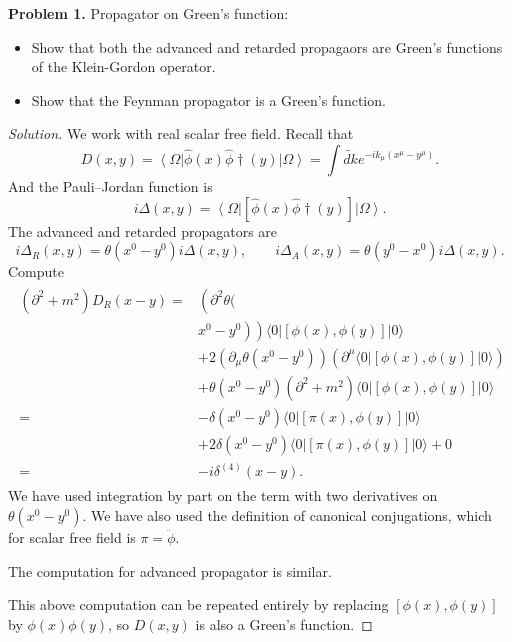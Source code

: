 
\textbf{Problem 1.} Propagator on Green's function:
\begin{itemize}
	\item Show that both the advanced and retarded propagaors are Green's functions of the Klein-Gordon operator.
	\item Show that the Feynman propagator is a Green's function.
\end{itemize}
	\begin{proof}[Solution]
		We work with real scalar free field. Recall that
		\[
			D(x,y) = \left\langle \Omega \right| \hat{\phi} \left( x \right) \hat{\phi} \dag (y) \left| \Omega \right\rangle = \int \tilde{dk} e^{- i k_ \mu (x^\mu - y^\mu)}
		.\] 
		And the Pauli–Jordan function is
		\[
			i \Delta(x,y) = \left\langle \Omega \right| \left[ \hat{\phi} (x) \hat{\phi} \dag(y) \right] \left| \Omega \right\rangle 
		.\] 
		The advanced and retarded propagators are
		\[
			i \Delta_R(x, y) = \theta(x^0 - y^0) i \Delta(x, y), \qquad 
			i \Delta_A(x,y) = \theta(y^0 - x^0) i \Delta(x,y)
		.\]
		Compute
		\begin{align*}
\begin{aligned}
\left(\partial^2+m^2\right) D_R(x-y)= & \left(\partial^2 \theta( \right. \\
& \left.\left.x^0-y^0\right)\right)\langle 0|[\phi(x), \phi(y)]|0\rangle \\
& +2\left(\partial_\mu \theta\left(x^0-y^0\right)\right)\left(\partial^\mu\langle 0|[\phi(x), \phi(y)]|0\rangle\right) \\
& +\theta\left(x^0-y^0\right)\left(\partial^2+m^2\right)\langle 0|[\phi(x), \phi(y)]|0\rangle \\
= & -\delta\left(x^0-y^0\right)\langle 0|[\pi(x), \phi(y)]|0\rangle \\
& +2 \delta\left(x^0-y^0\right)\langle 0|[\pi(x), \phi(y)]|0\rangle+0 \\
= & -i \delta^{(4)}(x-y) .
\end{aligned}
\end{align*}
We have used integration by part on the term with two derivatives on $\theta(x^0 - y^0)$. We have also used the definition of canonical conjugations, which for scalar free field is $\pi = \ddot{\phi} $.

The computation for advanced propagator is similar.

This above computation can be repeated entirely by replacing $[\phi(x), \phi(y)] $ by $\phi (x) \phi(y)$, so $D(x, y)$ is also a Green's function. 


\end{proof}
